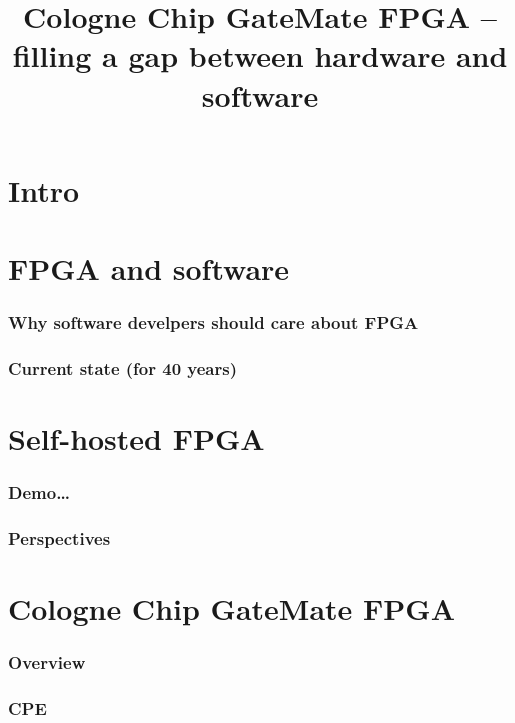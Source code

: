 
\usepackage{tikz}

\title{Cologne Chip GateMate FPGA -- filling a gap between hardware and software}




\begin{frame}
  \titlepage
\end{frame}

\section{Intro}



\frame{\tableofcontents[subsectionstyle=show]}

\section{FPGA and software}

\begin{frame}
\frametitle{Why software develpers should care about FPGA}
\end{frame}

\begin{frame}
\frametitle{Current state (for 40 years)}
\end{frame}

\section{Self-hosted FPGA}


\begin{frame}
\frametitle{Demo\dots}
\end{frame}

\begin{frame}
\frametitle{Perspectives}
\end{frame}

\section{Cologne Chip GateMate FPGA}

\begin{frame}
\frametitle{Overview}
\end{frame}

\begin{frame}
\frametitle{CPE}
\end{frame}

